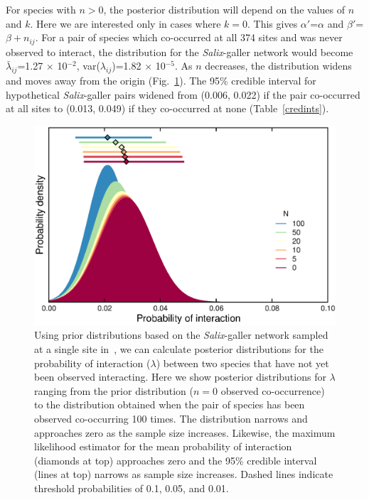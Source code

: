 \documentclass[12pt]{article}
\begin{document}
\begin{figure}[h!]
\begin{center}
          \end{center}
          \end{figure}


      For species with $n>0$, the posterior distribution will depend on the values of $n$ and $k$. Here we are interested only in cases where $k = 0$. This gives $\alpha'$=$\alpha$ and $\beta'$=$\beta + n_{ij}$. For a pair of species which co-occurred at all 374 sites and was never observed to interact, the distribution for the \emph{Salix}-galler network would become $\bar\lambda_{ij}$=1.27 $\times$ 10$^{-2}$, var($\lambda_{ij}$)=1.82 $\times$ 10$^{-5}$. As $n$ decreases, the distribution widens and moves away from the origin (Fig.~\ref{Salix_pdfs}). The 95\% credible interval for hypothetical \emph{Salix}-galler pairs widened from (0.006, 0.022) if the pair co-occurred at all sites to (0.013, 0.049) if they co-occurred at none (Table~\ref{credints}). 

      \begin{figure}[h!]
        \caption{Using prior distributions based on the \emph{Salix}-galler network sampled at a single site in~\citet{Kopelke2017}, we can calculate posterior distributions for the probability of interaction ($\lambda$) between two species that have not yet been observed interacting. Here we show posterior distributions for $\lambda$ ranging from the prior distribution ($n=0$ observed co-occurrence) to the distribution obtained when the pair of species has been observed co-occurring 100 times. The distribution narrows and approaches zero as the sample size increases. Likewise, the maximum likelihood estimator for the mean probability of interaction (diamonds at top) approaches zero and the 95\% credible interval (lines at top) narrows as sample size increases. Dashed lines indicate threshold probabilities of 0.1, 0.05, and 0.01.}
        \label{Salix_pdfs}
        \begin{center}
        \includegraphics*[width=.7\textwidth]{figures/SG_pdfs_increasing_N_Zillis.eps}
        \end{center}
        \end{figure}
\end{document}
